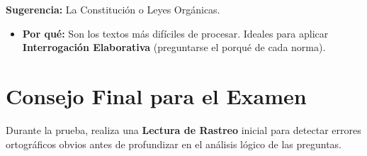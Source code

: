 \documentclass[12pt,a4paper]{article}
\begin{document}
\begin{tcolorbox}[colframe=orange!50!black, colback=white, title=3. Textos Jurídicos o Administrativos]
    \textbf{Sugerencia:} La Constitución o Leyes Orgánicas.
    \begin{itemize}
        \item \textbf{Por qué:} Son los textos más difíciles de procesar. Ideales para aplicar \textbf{Interrogación Elaborativa} (preguntarse el porqué de cada norma).
    \end{itemize}
\end{tcolorbox}

\section{Consejo Final para el Examen}
Durante la prueba, realiza una \textbf{Lectura de Rastreo} inicial para detectar errores ortográficos obvios antes de profundizar en el análisis lógico de las preguntas.
\end{document}
